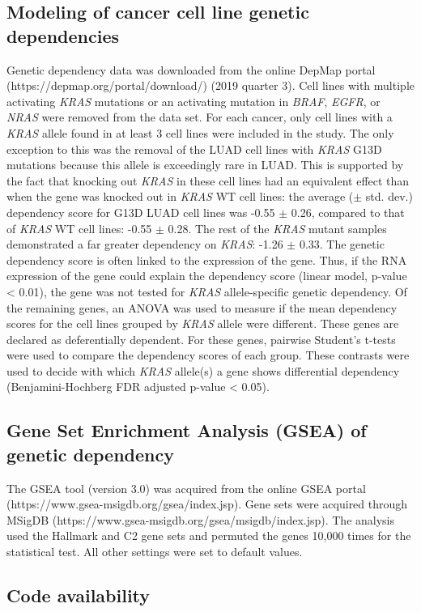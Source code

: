 \documentclass[english, 10pt, letterpaper]{article}
\newcommand{\KRAS}{\emph{KRAS}}
\begin{document}
\subsection*{Modeling of cancer cell line genetic dependencies}
Genetic dependency data was downloaded from the online DepMap portal (https://depmap.org/portal/download/) (2019 quarter 3).
Cell lines with multiple activating \KRAS{} mutations or an activating mutation in \emph{BRAF}, \emph{EGFR}, or \emph{NRAS} were removed from the data set.
For each cancer, only cell lines with a \KRAS{} allele found in at least 3 cell lines were included in the study.
The only exception to this was the removal of the LUAD cell lines with \KRAS{} G13D mutations because this allele is exceedingly rare in LUAD.
This is supported by the fact that knocking out \KRAS{} in these cell lines had an equivalent effect than when the gene was knocked out in \KRAS{} WT cell lines: the average ($\pm$ std. dev.) dependency score for G13D LUAD cell lines was -0.55 $\pm$ 0.26, compared to that of \KRAS{} WT cell lines: -0.55 $\pm$ 0.28. The rest of the \KRAS{} mutant samples demonstrated a far greater dependency on \KRAS{}: -1.26 $\pm$ 0.33.
The genetic dependency score is often linked to the expression of the gene.
Thus, if the RNA expression of the gene could explain the dependency score (linear model, p-value < 0.01), the gene was not tested for \KRAS{} allele-specific genetic dependency.
Of the remaining genes, an ANOVA was used to measure if the mean dependency scores for the cell lines grouped by \KRAS{} allele were different.
These genes are declared as deferentially dependent.
For these genes, pairwise Student's t-tests were used to compare the dependency scores of each group.
These contrasts were used to decide with which \KRAS{} allele(s) a gene shows differential dependency (Benjamini-Hochberg FDR adjusted p-value < 0.05).


\subsection*{Gene Set Enrichment Analysis (GSEA) of genetic dependency}
The GSEA tool (version 3.0) was acquired from the online GSEA portal (https://www.gsea-msigdb.org/gsea/index.jsp).
Gene sets were acquired through MSigDB (https://www.gsea-msigdb.org/gsea/msigdb/index.jsp).
The analysis used the Hallmark and C2 gene sets and permuted the genes 10,000 times for the statistical test.
All other settings were set to default values.


\subsection*{Code availability}
\end{document}

